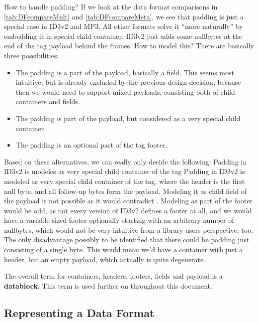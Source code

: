 How to handle padding? If we look at the data format comparisons in \ref{tab:DFcompareMult} and \ref{tab:DFcompareMeta}, we see that padding is just a special case in ID3v2 and MP3. All other formats solve it ``more naturally'' by embedding it in special child container. ID3v2 just adds some nullbytes at the end of the tag payload behind the frames. How to model this? There are basically three possibilities:
\begin{itemize}
\item The padding is a part of the payload, basically a field. This seems most intuitive, but is already excluded by the previous design decision, because then we would need to support mixed payloads, consisting both of child containers and fields.
\item The padding is part of the payload, but considered as a very special child container.
\item The padding is an optional part of the tag footer.
\end{itemize}

Based on these alternatives, we can really only decide the following:
{%
Padding in ID3v2 is modeles as very special child container of the tag
}
{%
Padding in ID3v2 is modeled as very special child container of the tag, where the header is the first null byte, and all follow-up bytes form the payload. 
}
{%
Modeling it as child field of the payload is not possible as it would contradict . Modeling as part of the footer would be odd, as not every version of ID3v2 defines a footer at all, and we would have a variable sized footer optionally starting with an arbitrary number of nullbytes, which would not be very intuitive from a library users perspective, too.
}
{%
The only disadvantage possibly to be identified that there could be padding just consisting of a single byte. This would mean we'd have a container with just a header, but an empty payload, which actually is quite degenerate.
}

The overall term for containers, headers, footers, fields and payload is a \textbf{datablock}. This term is used further on throughout this document.

\subsection{Representing a Data Format}%
\label{sec:RepresentingaDataFormat}%

